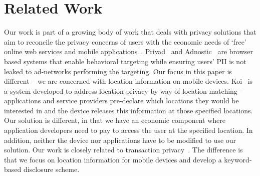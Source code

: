 \section{Related Work}
\label{sec:relwork}



Our work is part of a growing body of work that deals with privacy solutions that aim to reconcile the privacy concerns of users with the economic needs of `free' online web services and mobile applications~\cite{Guha:2011wj, guha:koi, Riederer:2011ta, Toubiana:2010tm}. 
Privad~\cite{Guha:2011wj} and Adnostic~\cite{Toubiana:2010tm} are browser based systems that enable behavioral targeting while ensuring users' PII is not leaked to ad-networks performing the targeting. 
Our focus in this paper is different -- we are concerned with location information on mobile devices. 
Koi~\cite{guha:koi} is a system developed to address location privacy by way of location matching -- applications and service providers pre-declare which locations they would be interested in and the device releases this information at those specified locations. 
Our solution is different, in that we have an economic component where application developers need to pay
to access the user at the specified location. 
In addition, neither the device nor applications have to be modified to use our solution. 
Our work is closely related to transaction privacy~\cite{Riederer:2011ta}.
The difference is that we focus on location information for mobile devices and develop a keyword-based disclosure scheme.


